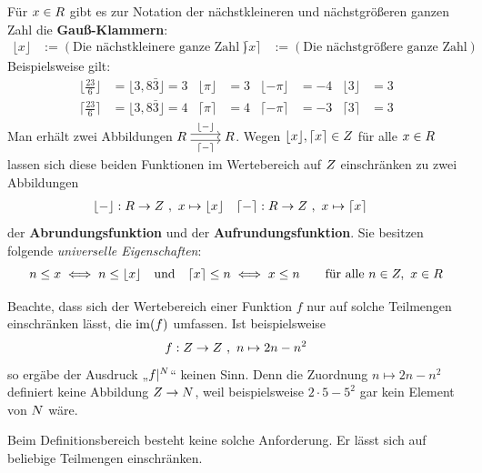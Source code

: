 \begin{bsp}
    Für $x\in \relax R$ gibt es zur Notation der nächstkleineren und nächstgrößeren ganzen Zahl die \textbf{Gauß-Klammern}:
    \begin{align*}
        \lfloor x\rfloor & := (\text{Die nächstkleinere ganze Zahl}) & \lceil x \rceil & := (\text{Die nächstgrößere ganze Zahl})
    \end{align*}
    Beispielsweise gilt:
    \begin{align*}
    \biggl\lfloor \frac{23}{6} \biggr\rfloor & = \lfloor 3{,}8\bar 3\rfloor = 3 & \lfloor \pi \rfloor & = 3 & \lfloor -\pi \rfloor & = -4 & \lfloor 3 \rfloor & = 3 \\
    \biggl\lceil \frac{23}{6} \biggr\rceil & = \lfloor 3{,}8\bar 3\rfloor = 4 & \lceil \pi \rceil & = 4 & \lceil -\pi \rceil & = -3 & \lceil 3 \rceil & = 3
    \end{align*}
    Man erhält zwei Abbildungen $\begin{tikzcd}[cramped] \R \ar[r, "\lfloor - \rfloor", shift left] \ar[r, "\lceil - \rceil"', shift right] & \R \end{tikzcd}$. Wegen $\lfloor x\rfloor,\lceil x\rceil\in \relax Z$ für alle $x\in \relax R$ lassen sich diese beiden Funktionen im Wertebereich auf $\relax Z$ einschränken zu zwei Abbildungen
    \begin{align*}
        \lfloor - \rfloor : \relax R \to \relax Z \ & ,\ x\mapsto \lfloor x\rfloor & \lceil - \rceil : \relax R \to \relax Z \ & ,\ x\mapsto \lceil x\rceil
    \end{align*}
    der \textbf{Abrundungsfunktion} und der \textbf{Aufrundungsfunktion}. Sie besitzen folgende \emph{universelle Eigenschaften}:
        \[ n \le x \iff n\le \lfloor x\rfloor \quad\text{und}\quad \lceil x \rceil \le n \iff x\le n \qquad \text{für alle}\ n\in \relax Z,\ x\in \relax R \]
\end{bsp}


\begin{bem}[*] \label{einschraenkbarkeit}
    Beachte, dass sich der Wertebereich einer Funktion $f$ nur auf solche Teilmengen einschränken lässt, die $\operatorname{im}(f)$ umfassen. Ist beispielsweise
        \[ f : \relax Z \to \relax Z \ ,\ n \mapsto 2n-n^2 \]
    so ergäbe der Ausdruck „$f\vert^{\relax N}$“ keinen Sinn. Denn die Zuordnung $n\mapsto 2n-n^2$ definiert keine Abbildung $\relax Z\to \relax N$, weil beispielsweise $2\cdot 5 - 5^2$ gar kein Element von $\relax N$ wäre.

    Beim Definitionsbereich besteht keine solche Anforderung. Er lässt sich auf beliebige Teilmengen einschränken.
\end{bem}





